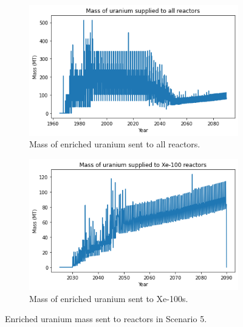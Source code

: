 \begin{figure}
    \centering
    \begin{subfigure}{0.5\textwidth}
        \centering
        \includegraphics[scale=0.5]{../figures/fuelsupply_scenarios_5.png}
        \caption{Mass of enriched uranium sent to all reactors.}
        \label{fig:totalfuel_5}
    \end{subfigure}
    \hspace{0.8cm}
    \begin{subfigure}{0.5\textwidth}
        \centering
        \includegraphics[scale=0.5]{../figures/advancedRX_fuelsupply_scenarios_5.png}
        \caption{Mass of enriched uranium sent to Xe-100s.}
        \label{fig:haleu_5}
    \end{subfigure}
    \caption{Enriched uranium mass sent to reactors in Scenario 5.}
    \label{fig:fuel_5}
\end{figure}

